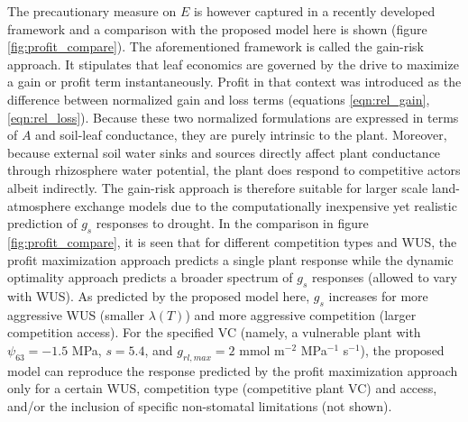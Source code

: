 \documentclass[utf8]{frontiersSCNS} %
\begin{document}
The precautionary measure on $E$ is however captured in a recently developed framework \citep{sperry_pragmatic_2016, sperry_predicting_2017} and a comparison with the proposed model here is shown (figure \ref{fig:profit_compare}). The aforementioned framework is called the gain-risk approach. It stipulates that leaf economics are governed by the drive to maximize a gain or profit term instantaneously. Profit in that context was introduced as the difference between normalized gain and loss terms (equations \ref{eqn:rel_gain}, \ref{eqn:rel_loss}). Because these two normalized formulations are expressed in terms of $A$ and soil-leaf conductance, they are purely intrinsic to the plant. Moreover, because external soil water sinks and sources directly affect plant conductance through rhizosphere water potential, the plant does respond to competitive actors albeit indirectly. The gain-risk approach is therefore suitable for larger scale land-atmosphere exchange models due to the computationally inexpensive yet realistic prediction of $g_s$ responses to drought. In the comparison in figure \ref{fig:profit_compare}, it is seen that for different competition types and WUS, the profit maximization approach predicts a single plant response while the dynamic optimality approach predicts a broader spectrum of $g_s$ responses (allowed to vary with WUS). As predicted by the proposed model here, $g_s$ increases for more aggressive WUS (smaller $\lambda(T)$) and more aggressive competition (larger competition access). For the specified VC (namely, a vulnerable plant with $\psi_{63} = -1.5$ MPa, $s=5.4$, and $g_{rl,max} = 2$ mmol m$^{-2}$ MPa$^{-1}$ s$^{-1}$), the proposed model can reproduce the response predicted by the profit maximization approach only for a certain WUS, competition type (competitive plant VC) and access, and/or the inclusion of specific non-stomatal limitations (not shown).

\end{document}
